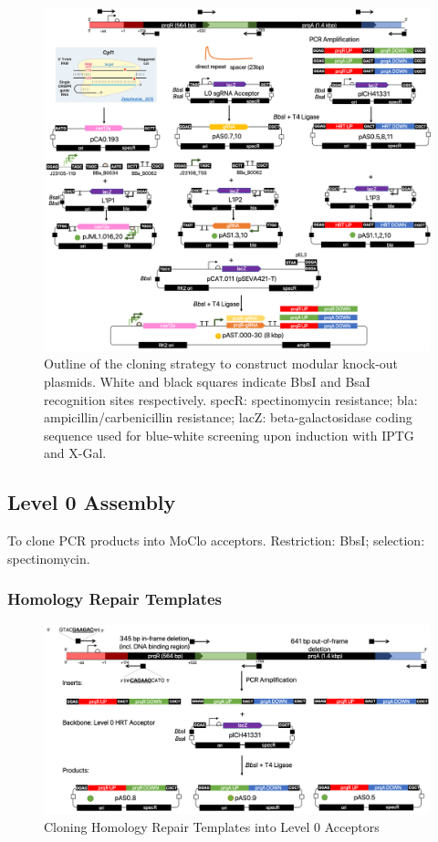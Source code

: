 \begin{figure}[H]
    \centering
    \includegraphics[width=\hsize]{figs/ASgate.png}
    \caption{Outline of the cloning strategy to construct modular knock-out plasmids. White and black squares indicate BbsI and BsaI recognition sites respectively. specR: spectinomycin resistance; bla: ampicillin/carbenicillin resistance; lacZ: beta-galactosidase coding sequence used for blue-white screening upon induction with IPTG and X-Gal.}
    \label{fig:KOstrategy}
\end{figure}

\newpage

\subsection{Level 0 Assembly}
To clone PCR products into MoClo acceptors. Restriction: BbsI; selection: spectinomycin.

\subsubsection{Homology Repair Templates}

\begin{figure}[H]
    \centering
    \includegraphics[width=\hsize]{figs/HRT.png}
    \caption{Cloning Homology Repair Templates into Level 0 Acceptors}
\end{figure}

